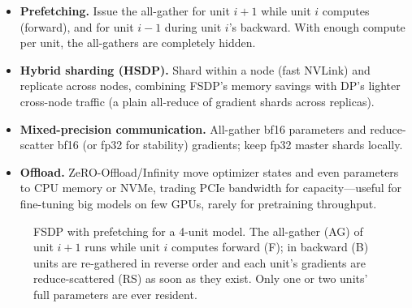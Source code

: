 \begin{systemslens}
\begin{itemize}
\item \textbf{Prefetching.} Issue the all-gather for unit $i+1$ while unit $i$ computes
  (forward), and for unit $i-1$ during unit $i$'s backward. With enough compute per unit, the
  all-gathers are completely hidden.
\item \textbf{Hybrid sharding (HSDP).} Shard within a node (fast NVLink) and replicate across
  nodes, combining FSDP's memory savings with DP's lighter cross-node traffic (a plain
  all-reduce of gradient shards across replicas).
\item \textbf{Mixed-precision communication.} All-gather bf16 parameters and reduce-scatter
  bf16 (or fp32 for stability) gradients; keep fp32 master shards locally.
\item \textbf{Offload.} ZeRO-Offload/Infinity move optimizer states and even parameters to CPU
  memory or NVMe, trading PCIe bandwidth for capacity---useful for fine-tuning big models on
  few GPUs, rarely for pretraining throughput.
\end{itemize}
\end{systemslens}

\begin{figure}[t]
\centering
{}
\caption{FSDP with prefetching for a 4-unit model. The all-gather (AG) of unit $i+1$ runs while
unit $i$ computes forward (F); in backward (B) units are re-gathered in reverse order and each
unit's gradients are reduce-scattered (RS) as soon as they exist. Only one or two units'
full parameters are ever resident.}
\label{fig:dist:fsdp}
\end{figure}

